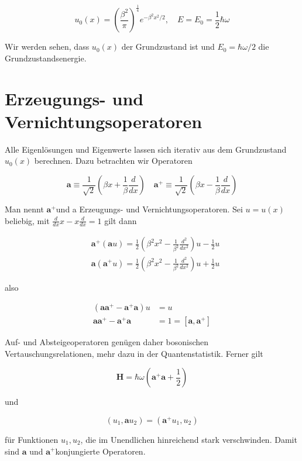 \documentclass[10pt, letterpaper]{article}
\begin{document}
$$
u_{0}(x)=\left(\frac{\beta^{2}}{\pi}\right)^{\frac{1}{4}} e^{-\beta^{2} x^{2} / 2}, \quad E=E_{0}=\frac{1}{2} \hbar \omega
$$

Wir werden sehen, dass $u_{0}(x)$ der Grundzustand ist und $E_{0}=\hbar \omega / 2$ die Grundzustandsenergie.

\section*{Erzeugungs- und Vernichtungsoperatoren}
Alle Eigenlösungen und Eigenwerte lassen sich iterativ aus dem Grundzustand $u_{0}(x)$ berechnen. Dazu betrachten wir Operatoren

$$
\mathbf{a} \equiv \frac{1}{\sqrt{2}}\left(\beta x+\frac{1}{\beta} \frac{d}{d x}\right) \quad \mathbf{a}^{+} \equiv \frac{1}{\sqrt{2}}\left(\beta x-\frac{1}{\beta} \frac{d}{d x}\right)
$$

Man nennt $\mathbf{a}^{+}$und a Erzeugungs- und Vernichtungsoperatoren. Sei $u=u(x)$ beliebig, mit $\frac{d}{d x} x-x \frac{d}{d x}=1$ gilt dann

$$
\begin{aligned}
& \mathbf{a}^{+}(\mathbf{a} u)=\frac{1}{2}\left(\beta^{2} x^{2}-\frac{1}{\beta^{2}} \frac{d^{2}}{d x^{2}}\right) u-\frac{1}{2} u \\
& \mathbf{a}\left(\mathbf{a}^{+} u\right)=\frac{1}{2}\left(\beta^{2} x^{2}-\frac{1}{\beta^{2}} \frac{d^{2}}{d x^{2}}\right) u+\frac{1}{2} u
\end{aligned}
$$

also

$$
\begin{aligned}
\left(\mathbf{a} \mathbf{a}^{+}-\mathbf{a}^{+} \mathbf{a}\right) u & =u \\
\mathbf{a a}^{+}-\mathbf{a}^{+} \mathbf{a} & =1=\left[\mathbf{a}, \mathbf{a}^{+}\right]
\end{aligned}
$$

Auf- und Absteigeoperatoren genügen daher bosonischen Vertauschungsrelationen, mehr dazu in der Quantenstatistik. Ferner gilt

$$
\mathbf{H}=\hbar \omega\left(\mathbf{a}^{+} \mathbf{a}+\frac{1}{2}\right)
$$

und

$$
\left(u_{1}, \mathbf{a} u_{2}\right)=\left(\mathbf{a}^{+} u_{1}, u_{2}\right)
$$

für Funktionen $u_{1}, u_{2}$, die im Unendlichen hinreichend stark verschwinden. Damit sind $\mathbf{a}$ und $\mathbf{a}^{+}$konjungierte Operatoren.
\end{document}
